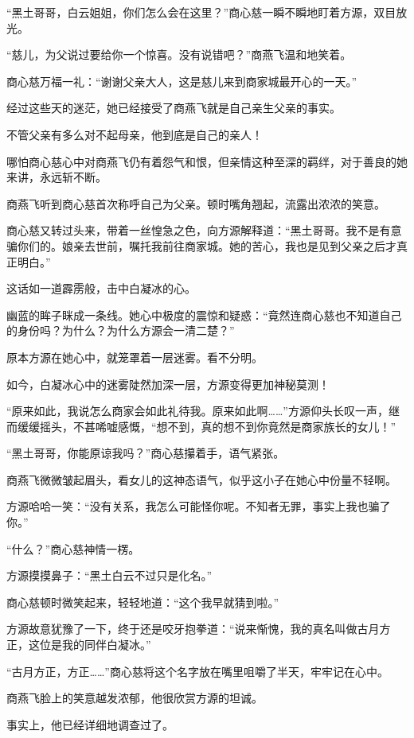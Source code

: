 \begin{this_body}
“黑土哥哥，白云姐姐，你们怎么会在这里？”商心慈一瞬不瞬地盯着方源，双目放光。

“慈儿，为父说过要给你一个惊喜。没有说错吧？”商燕飞温和地笑着。

商心慈万福一礼：“谢谢父亲大人，这是慈儿来到商家城最开心的一天。”

经过这些天的迷茫，她已经接受了商燕飞就是自己亲生父亲的事实。

不管父亲有多么对不起母亲，他到底是自己的亲人！

哪怕商心慈心中对商燕飞仍有着怨气和恨，但亲情这种至深的羁绊，对于善良的她来讲，永远斩不断。

商燕飞听到商心慈首次称呼自己为父亲。顿时嘴角翘起，流露出浓浓的笑意。

商心慈又转过头来，带着一丝惶急之色，向方源解释道：“黑土哥哥。我不是有意骗你们的。娘亲去世前，嘱托我前往商家城。她的苦心，我也是见到父亲之后才真正明白。”

这话如一道霹雳般，击中白凝冰的心。

幽蓝的眸子眯成一条线。她心中极度的震惊和疑惑：“竟然连商心慈也不知道自己的身份吗？为什么？为什么方源会一清二楚？”

原本方源在她心中，就笼罩着一层迷雾。看不分明。

如今，白凝冰心中的迷雾陡然加深一层，方源变得更加神秘莫测！

“原来如此，我说怎么商家会如此礼待我。原来如此啊……”方源仰头长叹一声，继而缓缓摇头，不甚唏嘘感慨，“想不到，真的想不到你竟然是商家族长的女儿！”

“黑土哥哥，你能原谅我吗？”商心慈攥着手，语气紧张。

商燕飞微微皱起眉头，看女儿的这神态语气，似乎这小子在她心中份量不轻啊。

方源哈哈一笑：“没有关系，我怎么可能怪你呢。不知者无罪，事实上我也骗了你。”

“什么？”商心慈神情一楞。

方源摸摸鼻子：“黑土白云不过只是化名。”

商心慈顿时微笑起来，轻轻地道：“这个我早就猜到啦。”

方源故意犹豫了一下，终于还是咬牙抱拳道：“说来惭愧，我的真名叫做古月方正，这位是我的同伴白凝冰。”

“古月方正，方正……”商心慈将这个名字放在嘴里咀嚼了半天，牢牢记在心中。

商燕飞脸上的笑意越发浓郁，他很欣赏方源的坦诚。

事实上，他已经详细地调查过了。


\end{this_body}
